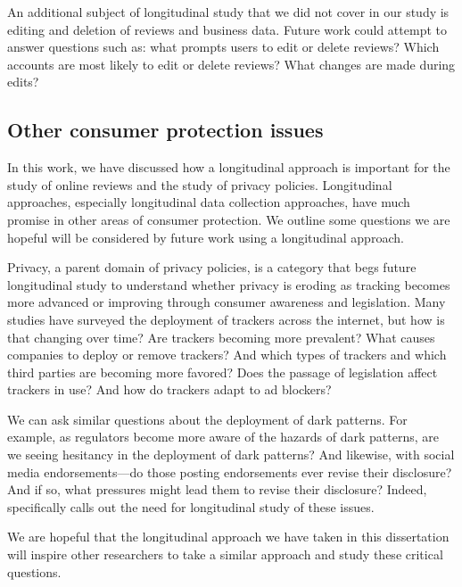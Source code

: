 An additional subject of longitudinal study that we did not cover in our study is editing and deletion of reviews and business data. Future work could attempt to answer questions such as: what prompts users to edit or delete reviews? Which accounts are most likely to edit or delete reviews? What changes are made during edits?

\subsection{Other consumer protection issues}\label{subsec:conclusion:other}

In this work, we have discussed how a longitudinal approach is important for the study of online reviews and the study of privacy policies. Longitudinal approaches, especially longitudinal data collection approaches, have much promise in other areas of consumer protection. We outline some questions we are hopeful will be considered by future work using a longitudinal approach. 

Privacy, a parent domain of privacy policies, is a category that begs future longitudinal study to understand whether privacy is eroding as tracking becomes more advanced or improving through consumer awareness and legislation. Many studies have surveyed the deployment of trackers across the internet, but how is that changing over time? Are trackers becoming more prevalent? What causes companies to deploy or remove trackers? And which types of trackers and which third parties are becoming more favored? Does the passage of legislation affect trackers in use? And how do trackers adapt to ad blockers?

We can ask similar questions about the deployment of dark patterns. For example, as regulators become more aware of the hazards of dark patterns, are we seeing hesitancy in the deployment of dark patterns? And likewise, with social media endorsements---do those posting endorsements ever revise their disclosure? And if so, what pressures might lead them to revise their disclosure? Indeed, \citet{mathur2020identifying} specifically calls out the need for longitudinal study of these issues.

We are hopeful that the longitudinal approach we have taken in this dissertation will inspire other researchers to take a similar approach and study these critical questions.